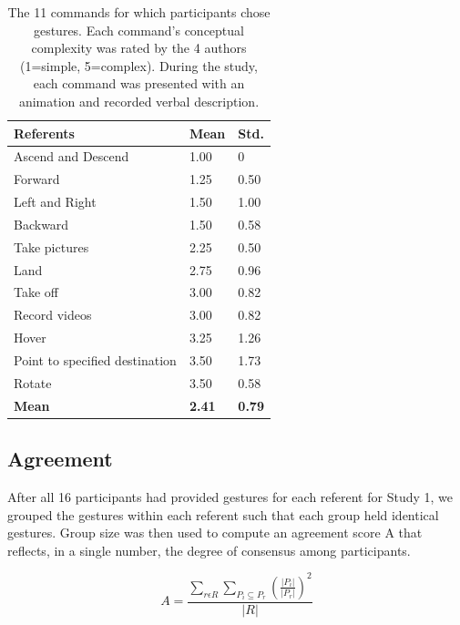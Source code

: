 \documentclass{sigchi}
\newcommand\tabhead[1]{\small\textbf{#1}}
\begin{document}
  \begin{table}
    \centering
    \begin{adjustwidth}{}{}
    \begin{tabular}{|l|l|l|}
      \hline
      \tabhead{Referents} &
      \multicolumn{1}{|p{0.13\columnwidth}|}{\centering\tabhead{Mean}} &
      \multicolumn{1}{|p{0.13\columnwidth}|}{\centering\tabhead{Std.}} \\
      \hline
      Ascend and Descend & 1.00 & 0 \\
      \hline
      Forward & 1.25 & 0.50\\
      \hline
      Left and Right & 1.50 & 1.00 \\
      \hline
      Backward & 1.50 & 0.58 \\
      \hline
      Take pictures & 2.25 & 0.50 \\
      \hline
      Land & 2.75 & 0.96 \\
      \hline
      Take off & 3.00 & 0.82 \\
      \hline
      Record videos & 3.00 & 0.82 \\
      \hline
      Hover & 3.25 & 1.26 \\
      \hline
      Point to specified destination & 3.50 & 1.73 \\
      \hline
      Rotate & 3.50 & 0.58 \\
      \hline
      \bf{Mean} & \bf{2.41} & \bf{0.79}\\
      \hline
    \end{tabular}
    \caption{The 11 commands for which participants chose gestures. Each command’s conceptual complexity was rated by the 4 authors (1=simple, 5=complex). During the study, each command was presented with an animation and recorded verbal description.}
    \label{tab:complexityTable}
  \end{adjustwidth}
  \end{table}

\subsection{Agreement}

After all 16 participants had provided gestures for each referent for Study 1, we grouped the gestures within each referent such that each group held identical gestures. Group size was then used to compute an agreement score A that reflects, in a single number, the degree of consensus among participants.

\begin{equation}
A = \frac{\displaystyle{\sum_{r\epsilon R }} \sum_{P_i \subseteq P_r } \left(\frac{\lvert{P_i}\rvert}{\lvert{P_r}\rvert}\right) ^ 2}{\displaystyle{\lvert{R}\rvert}}
\end{equation}
\end{document}
